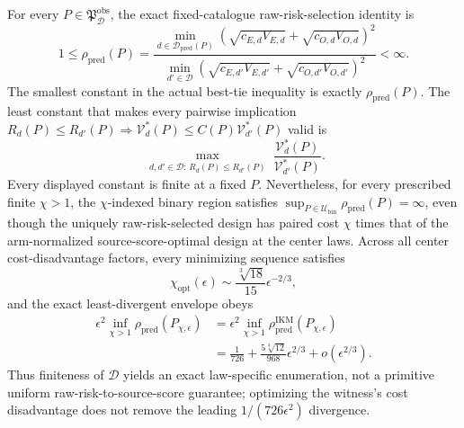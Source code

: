 For every \(P\in\mathfrak P_{\mathcal D}^{\mathrm{obs}}\), the exact fixed-catalogue raw-risk-selection identity is
\[
 1\le\rho_{\mathrm{pred}}(P)
 =\frac{\min_{d\in\mathcal D_{\mathrm{pred}}(P)}
 (\sqrt{c_{E,d}V_{E,d}}+\sqrt{c_{O,d}V_{O,d}})^2}
 {\min_{d'\in\mathcal D}
 (\sqrt{c_{E,d'}V_{E,d'}}+\sqrt{c_{O,d'}V_{O,d'}})^2}<\infty.
\]
The smallest constant in the actual best-tie inequality is exactly \(\rho_{\mathrm{pred}}(P)\). The least constant that makes every pairwise implication
\(R_d(P)\le R_{d'}(P)\Rightarrow \mathcal V_d^*(P)\le C(P)\mathcal V_{d'}^*(P)\)
valid is
\[
 \max_{\substack{d,d'\in\mathcal D:\,R_d(P)\le R_{d'}(P)}}
 \frac{\mathcal V_d^*(P)}{\mathcal V_{d'}^*(P)}.
\]
Every displayed constant is finite at a fixed \(P\). Nevertheless, for every prescribed finite \(\chi>1\), the \(\chi\)-indexed binary region satisfies \(\sup_{P\in\mathcal U_{\mathrm{bin}}}\rho_{\mathrm{pred}}(P)=\infty\), even though the uniquely raw-risk-selected design has paired cost \(\chi\) times that of the arm-normalized source-score-optimal design at the center laws. Across all center cost-disadvantage factors, every minimizing sequence satisfies
\[
 \chi_{\mathrm{opt}}(\epsilon)
 \sim\frac{\sqrt[3]{18}}{15}\epsilon^{-2/3},
\]
and the exact least-divergent envelope obeys
\[
\begin{aligned}
 \epsilon^2\inf_{\chi>1}\rho_{\mathrm{pred}}(P_{\chi,\epsilon})
 &=\epsilon^2\inf_{\chi>1}\rho_{\mathrm{pred}}^{\mathrm{IKM}}(P_{\chi,\epsilon})\\
 &=\frac1{726}+\frac{5\sqrt[3]{12}}{968}\epsilon^{2/3}
 +o(\epsilon^{2/3}).
\end{aligned}
\]
Thus finiteness of \(\mathcal D\) yields an exact law-specific enumeration, not a primitive uniform raw-risk-to-source-score guarantee; optimizing the witness's cost disadvantage does not remove the leading \(1/(726\epsilon^2)\) divergence.